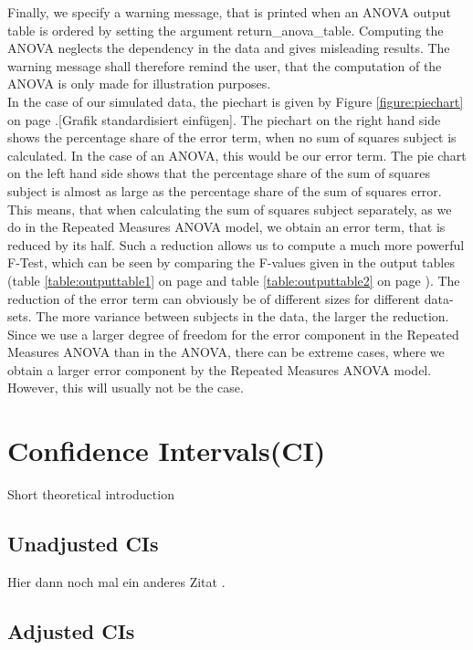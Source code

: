 \documentclass[11pt]{article}
\begin{document}
				Finally, we specify a warning message, that is printed when an ANOVA output table is ordered by setting the argument return_anova_table. Computing the ANOVA neglects the dependency in the data and gives misleading results. The warning message shall therefore remind the user, that the computation of the ANOVA is only made for illustration purposes.\\
				
				In the case of our simulated data, the piechart is given by Figure \ref{figure:piechart} on page \pageref{figure:piechart}.[Grafik standardisiert einfügen]. The piechart on the right hand side shows the percentage share of the error term, when no sum of squares subject is calculated. In the case of an ANOVA, this would be our error term. The pie chart on the left hand side shows that the percentage share of the sum of squares subject is almost as large as the percentage share of the sum of squares error. This means, that when calculating the sum of squares subject separately, as we do in the Repeated Measures ANOVA model, we obtain an error term, that is reduced by its half. Such a reduction allows us to compute a much more powerful F-Test, which can be seen by comparing the F-values given in the output tables (table \ref{table:outputtable1} on page \pageref{table:outputtable1} and table \ref{table:outputtable2} on page \pageref{output:outputtable2}). The reduction of the error term can obviously be of different sizes for different data-sets. The more variance between subjects in the data, the larger the reduction. Since we use a larger degree of freedom for the error component in the Repeated Measures ANOVA than in the ANOVA, there can be extreme cases, where we obtain a larger error component by the Repeated Measures ANOVA model. However, this will usually not be the case.
		

   
		
		
	\section{Confidence Intervals(CI)}
	Short theoretical introduction
		\subsection{Unadjusted CIs}
		Hier dann noch mal ein anderes Zitat \citep{003}.
		\subsection{Adjusted CIs}
		
\end{document}
